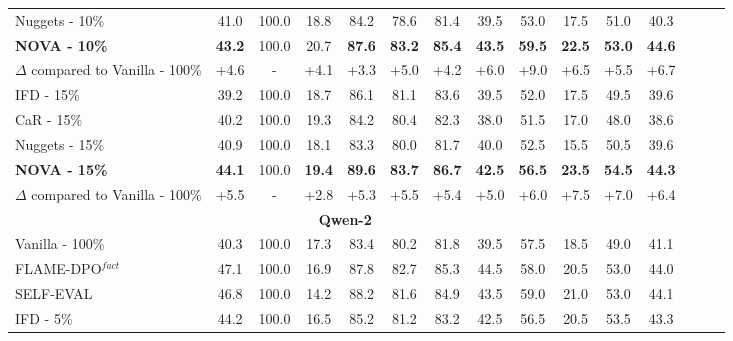 \begin{table*}
{\begin{tabular}{lcccccccccccccc}
Nuggets - 10\% & 41.0 & 100.0 & 18.8  & 84.2 & 78.6 & 81.4 & 39.5 		& 	53.0 		& 	17.5 		& 	51.0 		& 	40.3 \\
\rowcolor{blue!5} \textbf{NOVA - 10\%} & \textbf{43.2} & 100.0 & 20.7  & \textbf{87.6} & \textbf{83.2} & \textbf{85.4}& \textbf{43.5} 	&		\textbf{59.5} 			& \textbf{22.5} 		&	\textbf{53.0} 	&		\textbf{44.6}  \\
\hdashline[2pt/3pt]
\rowcolor{blue!5} $\Delta$ compared to Vanilla - 100\% & \textcolor[rgb]{0.7,0,0}{+4.6} & - & \textcolor[rgb]{0.7,0,0}{+4.1} & \textcolor[rgb]{0.7,0,0}{+3.3} & \textcolor[rgb]{0.7,0,0}{+5.0}  & \textcolor[rgb]{0.7,0,0}{+4.2} & \textcolor[rgb]{0.7,0,0}{+6.0} 	&		\textcolor[rgb]{0.7,0,0}{+9.0} 		&	\textcolor[rgb]{0.7,0,0}{+6.5} 	&		\textcolor[rgb]{0.7,0,0}{+5.5} 	&		\textcolor[rgb]{0.7,0,0}{+6.7} \\
\midrule
IFD - 15\% & 39.2 & 100.0 & 18.7 & 86.1 & 81.1  & 83.6 & 39.5 	&		52.0 		&	17.5 	&		49.5 	&		39.6 \\
CaR - 15\% & 40.2 & 100.0 & 19.3 & 84.2 & 80.4  & 82.3 & 38.0 	&		51.5 	&		17.0 		&	48.0 		&	38.6 \\
Nuggets - 15\% & 40.9 & 100.0 & 18.1 & 83.3  & 80.0 & 81.7 &40.0 		&	52.5 		&	15.5 		&	50.5 &			39.6 \\
\rowcolor{blue!5} \textbf{NOVA - 15\%} & \textbf{44.1} & 100.0 & \textbf{19.4} & \textbf{89.6} & \textbf{83.7}  & \textbf{86.7} &\textbf{42.5} 		&	\textbf{56.5} 		&	\textbf{23.5} 	&		\textbf{54.5} 	&		\textbf{44.3}   \\
\hdashline[2pt/3pt]
\rowcolor{blue!5} $\Delta$ compared to Vanilla - 100\% & \textcolor[rgb]{0.7,0,0}{+5.5} & - & \textcolor[rgb]{0.7,0,0}{+2.8}  & \textcolor[rgb]{0.7,0,0}{+5.3} & \textcolor[rgb]{0.7,0,0}{+5.5} & \textcolor[rgb]{0.7,0,0}{+5.4} &\textcolor[rgb]{0.7,0,0}{+5.0} 	&		\textcolor[rgb]{0.7,0,0}{+6.0} 	&		\textcolor[rgb]{0.7,0,0}{+7.5} &			\textcolor[rgb]{0.7,0,0}{+7.0} 		&	\textcolor[rgb]{0.7,0,0}{+6.4} \\
\midrule
\multicolumn{12}{c}{\cellcolor{myyellow} \textbf{Qwen-2}} \\
Vanilla - 100\% & 40.3 & 100.0 & 17.3 &83.4&	80.2&	81.8 	 & 39.5 & 57.5 & 18.5 & 49.0 & 41.1  \\
FLAME-DPO$^{fact}$ & 47.1	&100.0	&16.9	&87.8&	82.7&	85.3 	& 44.5 & 58.0 & 20.5 & 53.0 & 44.0  \\
SELF-EVAL & 46.8	&100.0 	&14.2	&88.2&	81.6&	84.9  & 43.5 & 59.0 & 21.0 & 53.0 & 44.1 \\
\midrule
IFD - 5\% &44.2&	100.0 	&16.5&	85.2&	81.2	&83.2  & 42.5 & 56.5 & 20.5 & 53.5 & 43.3\\

\end{tabular}}
\end{table*}
